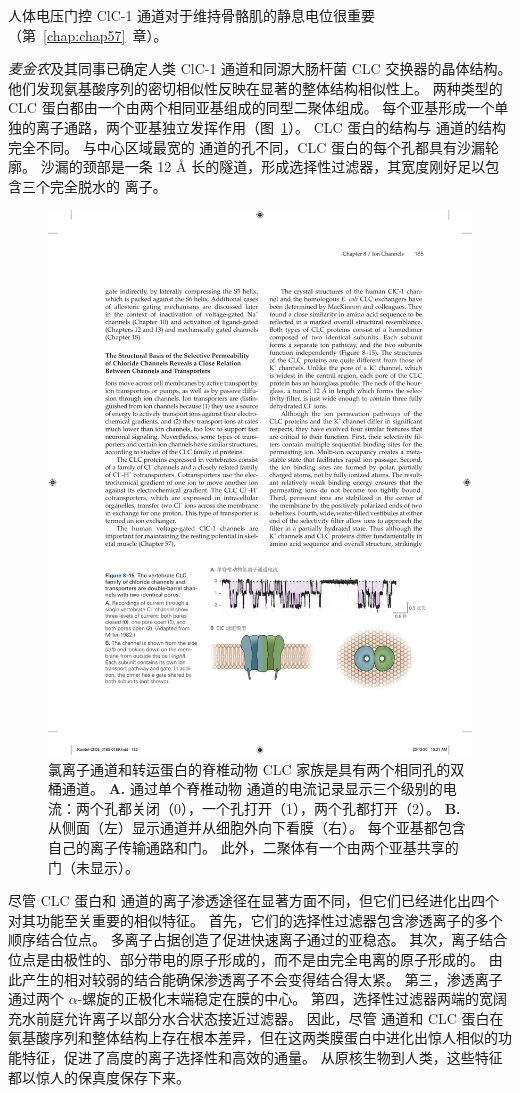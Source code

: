 人体电压门控 ClC-1 通道对于维持骨骼肌的静息电位很重要（第~\ref{chap:chap57}~章）。


\textit{麦金农}及其同事已确定人类 ClC-1 通道和同源大肠杆菌 CLC 交换器的晶体结构。
他们发现氨基酸序列的密切相似性反映在显著的整体结构相似性上。
两种类型的 CLC 蛋白都由一个由两个相同亚基组成的同型二聚体组成。
每个亚基形成一个单独的离子通路，两个亚基独立发挥作用（图~\ref{fig:8_15}）。
CLC 蛋白的结构与  通道的结构完全不同。
与中心区域最宽的  通道的孔不同，CLC 蛋白的每个孔都具有沙漏轮廓。
沙漏的颈部是一条 12 Å 长的隧道，形成选择性过滤器，其宽度刚好足以包含三个完全脱水的  离子。


\begin{figure}[htbp]
	\centering
	\includegraphics[width=0.8\linewidth]{chap08/fig_8_15}
	\caption{氯离子通道和转运蛋白的脊椎动物 CLC 家族是具有两个相同孔的双桶通道。
		\textbf{A.} 通过单个脊椎动物  通道的电流记录显示三个级别的电流：两个孔都关闭（0），一个孔打开（1），两个孔都打开（2）。 
		\textbf{B.} 从侧面（左）显示通道并从细胞外向下看膜（右）。
		每个亚基都包含自己的离子传输通路和门。
		此外，二聚体有一个由两个亚基共享的门（未显示）。}
	\label{fig:8_15}
\end{figure}


尽管 CLC 蛋白和  通道的离子渗透途径在显著方面不同，但它们已经进化出四个对其功能至关重要的相似特征。
首先，它们的选择性过滤器包含渗透离子的多个顺序结合位点。
多离子占据创造了促进快速离子通过的亚稳态。
其次，离子结合位点是由极性的、部分带电的原子形成的，而不是由完全电离的原子形成的。
由此产生的相对较弱的结合能确保渗透离子不会变得结合得太紧。
第三，渗透离子通过两个 $\alpha$-螺旋的正极化末端稳定在膜的中心。
第四，选择性过滤器两端的宽阔充水前庭允许离子以部分水合状态接近过滤器。
因此，尽管  通道和 CLC 蛋白在氨基酸序列和整体结构上存在根本差异，但在这两类膜蛋白中进化出惊人相似的功能特征，促进了高度的离子选择性和高效的通量。 
从原核生物到人类，这些特征都以惊人的保真度保存下来。


